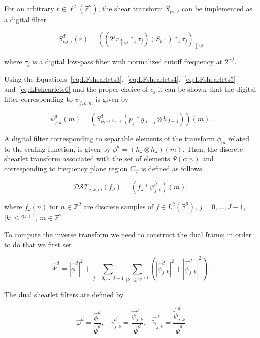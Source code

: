 \bigskip

For an arbitrary $r\in \ell^2(\mathbb{Z}^2)$, the shear transform $S_{k 2^{-j}}$ can be implemented as a digital filter

\begin{equation}
\label{eq:LFshearlets6}
S^d_{k 2^{-j}}(r)=((2^jr_{\uparrow 2^j}\ast_1\tau_j)(S_k\cdot)\ast_1\overline{\tau}_j)_{\downarrow 2^j}
\end{equation}

where $\tau_j$ is a digital low-pass filter with normalized cutoff frequency at $2^{-j}$. 

\bigskip

Using the Equations~\ref{eq:LFshearlets3},~\ref{eq:LFshearlets4},~\ref{eq:LFshearlets5} and~\ref{eq:LFshearlets6} and the proper choice of $c_j$ it can be shown that the digital filter corresponding to $\psi_{j,k,m}$ is given by

$$
\psi_{j,k}^d(m)=(S^d_{k2^{-(j+1)}}(p_j\ast g_{J-j}\otimes h_{J+1}))(m).
$$

A digital filter corresponding to separable elements of the transform $\phi_m$ related to the scaling function, is given by $\phi^d=(h_J\otimes h_J)(m)$. Then, the discrete shearlet transform associated with the set of elements $\Psi(c;\psi)$ and corresponding to frequency plane region $C_{\psi}$ is defined as follows

$$
\mathcal{DST}_{j,k,m}(f_J)=(f_J\ast \overline{\psi_{j,k}^d})(m),
$$

where $f_J(n)$ for $n\in\mathbb{Z}^2$ are discrete samples of $f\in L^2(\mathbb{R}^2)$, $j=0,\ldots,J-1$, $|k|\leq 2^{j+1}$, $m\in\mathbb{Z}^2$.

\bigskip

To compute the inverse transform we need to construct the dual frame; in order to do that we first set

$$
\hat{\Psi}^d=|\hat{\phi}^d|^2+\sum_{j=0,\ldots,J-1}\sum_{|k|\leq 2^{j+1}}(|\hat{\psi}^d_{j,k}|^2+|\hat{\tilde{\psi}}_{j,k}^d|^2).
$$ 

The dual shearlet filters are defined by

$$
\hat{\varphi}^d=\frac{\hat{\phi}^d}{\hat{\Psi}^d}\textrm{,}\quad \hat{\gamma}^d_{j,k}=\frac{\hat{\psi}^d_{j,k}}{\hat{\Psi}^d}\textrm{,}\quad \hat{\tilde{\gamma}}^d_{j,k}=\frac{\hat{\tilde{\psi}}_{j,k}^d}{\hat{\Psi}^d}
$$

